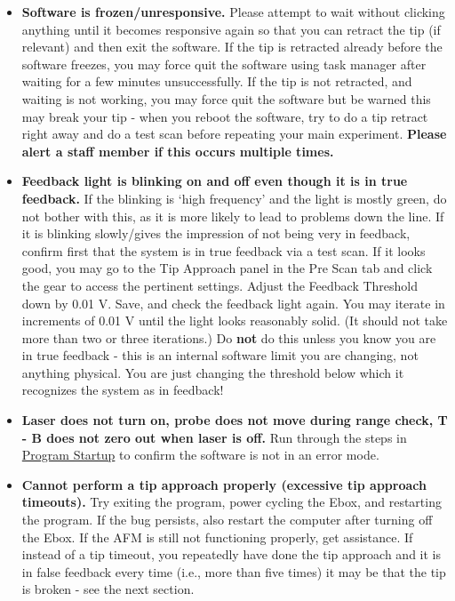 \documentclass{../lab}
\begin{document}
\begin{itemize}

    \item \textbf{Software is frozen/unresponsive.} Please attempt to wait without clicking anything until it becomes responsive again so that you can retract the tip (if relevant) and then exit the software. If the tip is retracted already before the software freezes, you may force quit the software using task manager after waiting for a few minutes unsuccessfully. If the tip is not retracted, and waiting is not working, you may force quit the software but be warned this may break your tip - when you reboot the software, try to do a tip retract right away and do a test scan before repeating your main experiment. \textbf{Please alert a staff member if this occurs multiple times.}

    \item \textbf{Feedback light is blinking on and off even though it is in true feedback.} If the blinking is `high frequency' and the light is mostly green, do not bother with this, as it is more likely to lead to problems down the line. If it is blinking slowly/gives the impression of not being very in feedback, confirm first that the system is in true feedback via a test scan. If it looks good, you may go to the Tip Approach panel in the Pre Scan tab and click the gear to access the pertinent settings. Adjust the Feedback Threshold down by 0.01 V. Save, and check the feedback light again. You may iterate in increments of 0.01 V until the light looks reasonably solid. (It should not take more than two or three iterations.) Do \textbf{not} do this unless you know you are in true feedback - this is an internal software limit you are changing, not anything physical. You are just changing the threshold below which it recognizes the system as in feedback!
    
    \item \textbf{Laser does not turn on, probe does not move during range check, T - B does not zero out when laser is off.} Run through the steps in \hyperref[subsec:TurnOnInstrumentsAndOpenPrograms]{Program Startup} to confirm the software is not in an error mode.

    \item \textbf{Cannot perform a tip approach properly (excessive tip approach timeouts).} Try exiting the program, power cycling the Ebox, and restarting the program. If the bug persists, also restart the computer after turning off the Ebox. If the AFM is still not functioning properly, get assistance. If instead of a tip timeout, you repeatedly have done the tip approach and it is in false feedback every time (i.e., more than five times) it may be that the tip is broken - see the next section.


\end{itemize}
\end{document}
